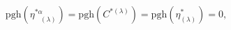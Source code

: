 \begin{equation}
\mathrm{pgh}\left( \eta _{\;\;\;(\lambda )}^{*\alpha }\right) =\mathrm{pgh}%
\left( C^{*(\lambda )}\right) =\mathrm{pgh}\left( \eta _{(\lambda
)}^{*}\right) =0,  \label{cin5}
\end{equation}


